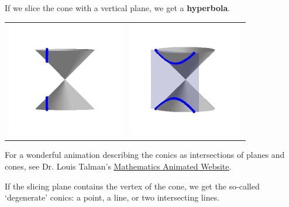 \documentclass[nooutcomes]{ximera}
\begin{document}
If we slice the cone with a vertical plane, we get a  \textbf{hyperbola}.

\begin{center}

\begin{tabular}{cc}

\includegraphics[width=2in]{./ConicsGraphics/Hyperbola01.jpg} & \includegraphics[width=2in]{./ConicsGraphics/Hyperbola02.jpg} \\

\end{tabular}

\end{center}

For a wonderful animation describing the conics as intersections of planes and cones, see Dr. Louis Talman's  \href{http://clem.mscd.edu/~talmanl/HTML/ConicSections.html}{\underline{Mathematics Animated Website}}.

If the slicing plane contains the vertex of the cone, we get the so-called `degenerate' conics:  a point, a line, or two intersecting lines.  
\end{document}
